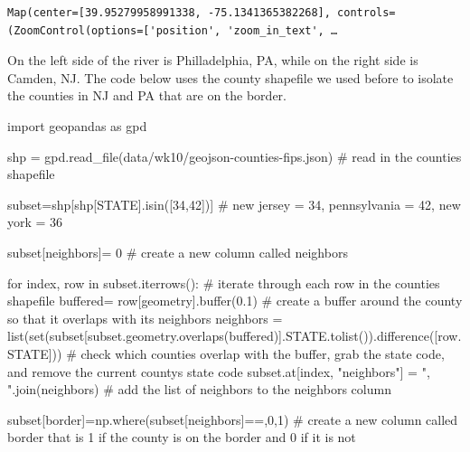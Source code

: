 \documentclass[
  letterpaper,
  DIV=11,
  numbers=noendperiod]{scrreprt}
\newenvironment{Shaded}{\begin{snugshade}}{\end{snugshade}}
\newcommand{\BuiltInTok}[1]{\textcolor[rgb]{0.00,0.23,0.31}{#1}}
\newcommand{\CommentTok}[1]{\textcolor[rgb]{0.37,0.37,0.37}{#1}}
\newcommand{\ControlFlowTok}[1]{\textcolor[rgb]{0.00,0.23,0.31}{#1}}
\newcommand{\DecValTok}[1]{\textcolor[rgb]{0.68,0.00,0.00}{#1}}
\newcommand{\FloatTok}[1]{\textcolor[rgb]{0.68,0.00,0.00}{#1}}
\newcommand{\ImportTok}[1]{\textcolor[rgb]{0.00,0.46,0.62}{#1}}
\newcommand{\KeywordTok}[1]{\textcolor[rgb]{0.00,0.23,0.31}{#1}}
\newcommand{\NormalTok}[1]{\textcolor[rgb]{0.00,0.23,0.31}{#1}}
\newcommand{\OperatorTok}[1]{\textcolor[rgb]{0.37,0.37,0.37}{#1}}
\newcommand{\StringTok}[1]{\textcolor[rgb]{0.13,0.47,0.30}{#1}}
\begin{document}
\begin{verbatim}
Map(center=[39.95279958991338, -75.1341365382268], controls=(ZoomControl(options=['position', 'zoom_in_text', …
\end{verbatim}

On the left side of the river is Philladelphia, PA, while on the right
side is Camden, NJ. The code below uses the county shapefile we used
before to isolate the counties in NJ and PA that are on the border.

\begin{Shaded}
\begin{Highlighting}[]
\ImportTok{import}\NormalTok{ geopandas }\ImportTok{as}\NormalTok{ gpd}

\NormalTok{shp }\OperatorTok{=}\NormalTok{ gpd.read\_file(}\StringTok{\textquotesingle{}data/wk10/geojson{-}counties{-}fips.json\textquotesingle{}}\NormalTok{) }\CommentTok{\# read in the counties shapefile}

\NormalTok{subset}\OperatorTok{=}\NormalTok{shp[shp[}\StringTok{\textquotesingle{}STATE\textquotesingle{}}\NormalTok{].isin([}\StringTok{\textquotesingle{}34\textquotesingle{}}\NormalTok{,}\StringTok{\textquotesingle{}42\textquotesingle{}}\NormalTok{])] }\CommentTok{\# new jersey = 34, pennsylvania = 42, new york = 36}

\NormalTok{subset[}\StringTok{\textquotesingle{}neighbors\textquotesingle{}}\NormalTok{]}\OperatorTok{=} \DecValTok{0} \CommentTok{\# create a new column called neighbors}

\ControlFlowTok{for}\NormalTok{ index, row }\KeywordTok{in}\NormalTok{ subset.iterrows():  }\CommentTok{\# iterate through each row in the counties shapefile}
\NormalTok{    buffered}\OperatorTok{=}\NormalTok{ row[}\StringTok{\textquotesingle{}geometry\textquotesingle{}}\NormalTok{].}\BuiltInTok{buffer}\NormalTok{(}\FloatTok{0.1}\NormalTok{) }\CommentTok{\# create a buffer around the county so that it overlaps with its neighbors}
\NormalTok{    neighbors }\OperatorTok{=} \BuiltInTok{list}\NormalTok{(}\BuiltInTok{set}\NormalTok{(subset[subset.geometry.overlaps(buffered)].STATE.tolist()).difference([row.STATE])) }\CommentTok{\# check which counties overlap with the buffer, grab the state code, and remove the current county\textquotesingle{}s state code}
\NormalTok{    subset.at[index, }\StringTok{"neighbors"}\NormalTok{] }\OperatorTok{=} \StringTok{", "}\NormalTok{.join(neighbors) }\CommentTok{\# add the list of neighbors to the neighbors column}

\NormalTok{subset[}\StringTok{\textquotesingle{}border\textquotesingle{}}\NormalTok{]}\OperatorTok{=}\NormalTok{np.where(subset[}\StringTok{\textquotesingle{}neighbors\textquotesingle{}}\NormalTok{]}\OperatorTok{==}\StringTok{\textquotesingle{}\textquotesingle{}}\NormalTok{,}\DecValTok{0}\NormalTok{,}\DecValTok{1}\NormalTok{) }\CommentTok{\# create a new column called border that is 1 if the county is on the border and 0 if it is not}


\end{Highlighting}
\end{Shaded}
\end{document}
